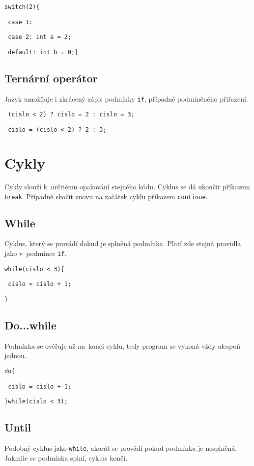 \documentclass[czech]{thesiskiv}
\begin{document}

\texttt{switch(2)\{}

\texttt{    case 1: }

\texttt{    case 2: int a = 2;}

\texttt{    default: int b = 0;\}}

\subsection{Ternární operátor}
Jazyk umožňuje i zkrácený zápis podmínky \texttt{if}, případně podmíněného přiřazení.


\texttt{  (cislo < 2) ? cislo = 2 : cislo = 3;}


\texttt{  cislo = (cislo < 2) ? 2 : 3;}

               
\section{Cykly}
Cykly slouží k~určitému opakování stejného kódu. Cyklus se dá ukončit příkazem \texttt{break}.
Případně skočit znovu na začátek cyklu příkazem \texttt{continue}.

\subsection{While}
Cyklus, který se provádí dokud je splněná podmínka.
Platí zde stejná pravidla jako v~podmínce \texttt{if}.


\texttt{while(cislo < 3)\{}

\texttt{    cislo = cislo + 1;}

\texttt{\}}

\subsection{Do...while}
Podmínka se ověřuje až na~konci cyklu, tedy program se vykoná vždy alespoň jednou.


\texttt{do\{}

\texttt{    cislo = cislo + 1;}

\texttt{\}while(cislo < 3);}

\subsection{Until}
Podobný cyklus jako \texttt{while}, akorát se provádí pokud podmínka je nesplněná.
Jakmile se podmínka splní, cyklus končí.
\end{document}
